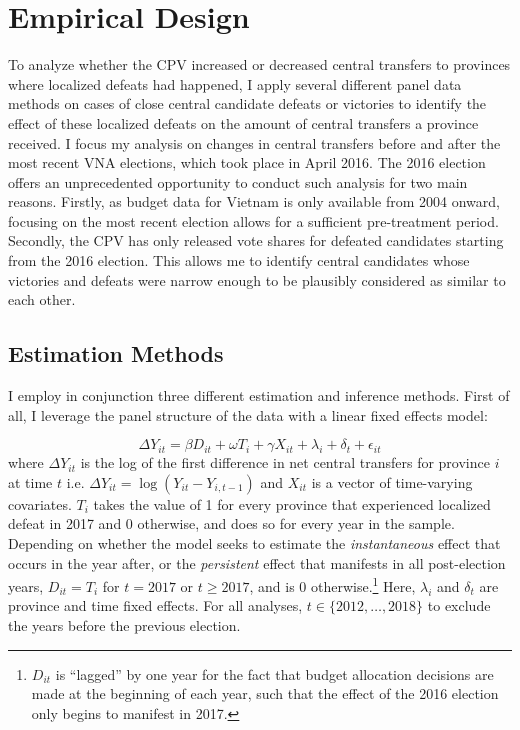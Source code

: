 \documentclass[12pt]{article}
\newcommand\fnote[1]{\footnote{\baselineskip=2\normalbaselineskip#1}}
\newcommand{\1}{\mathbbm{1}}
\begin{document}
\section{Empirical Design}
\label{sec:methods}

To analyze whether the CPV increased or decreased central transfers to provinces where localized defeats had happened, I apply several different panel data methods on cases of close central candidate defeats or victories to identify the effect of these localized defeats on the amount of central transfers a province received. I focus my analysis on changes in central transfers before and after the most recent VNA elections, which took place in April 2016. The 2016 election offers an unprecedented opportunity to conduct such analysis for two main reasons. Firstly, as budget data for Vietnam is only available from 2004 onward, focusing on the most recent election allows for a sufficient pre-treatment period. Secondly, the CPV has only released vote shares for defeated candidates starting from the 2016 election. This allows me to identify central candidates whose victories and defeats were narrow enough to be plausibly considered as similar to each other.

\subsection{Estimation Methods}
\label{sec:methods_estimation}
I employ in conjunction three different estimation and inference methods. First of all, I leverage the panel structure of the data with a linear fixed effects model:

\begin{equation}
\Delta Y_{it} = \beta D_{it} + \omega T_{i} + \gamma X_{it} + \lambda_i + \delta_t + \epsilon_{it} \label{eq:FE}
\end{equation}
where $\Delta Y_{it}$ is the log of the first difference in net central transfers for province $i$ at time $t$ i.e. $\Delta Y_{it} = \log(Y_{it} - Y_{i, t-1})$ and $X_{it}$ is a vector of time-varying covariates. $T_{i}$ takes the value of 1 for every province that experienced localized defeat in 2017 and 0 otherwise, and does so for every year in the sample. Depending on whether the model seeks to estimate the \textit{instantaneous} effect that occurs in the year after, or the \textit{persistent} effect that manifests in all post-election years, $D_{it} = T_{i}$ for $t=2017$ or $t\geq2017$, and is  $0$ otherwise.\fnote{$D_{it}$ is ``lagged'' by one year for the fact that budget allocation decisions are made at the beginning of each year, such that the effect of the 2016 election only begins to manifest in 2017.} Here, $\lambda_i$ and $\delta_t$ are province and time fixed effects. For all analyses, $t \in \{2012, \ldots, 2018\}$ to exclude the years before the previous election.
\end{document}
